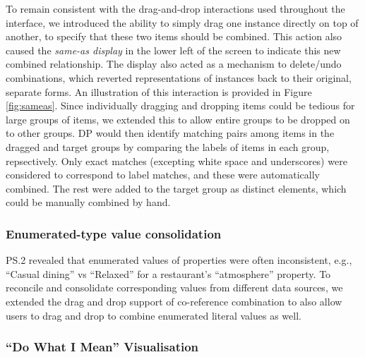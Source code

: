 \documentclass{sigchi}
\begin{document}
To remain consistent with the drag-and-drop interactions used throughout the interface, we introduced the ability to simply drag one instance directly on top of another, to specify that these two items should be combined.  This action also caused the \emph{same-as display} in the lower left of the screen to indicate this new combined relationship.  The display also acted as a mechanism to delete/undo combinations, which reverted representations of instances back to their original, separate forms. An illustration of this interaction is provided in Figure \ref{fig:sameas}.  Since individually dragging and dropping items could be tedious for large groups of items, we extended this to allow entire groups to be dropped on to other groups.  DP would then identify matching pairs among items in the dragged and target groups by comparing the labels of items in each group, repsectively.  Only exact matches (excepting white space and underscores) were considered to correspond to label matches, and these were automatically combined.  The rest were added to the target group as distinct elements, which could be manually combined by hand.


\subsubsection{Enumerated-type value consolidation}
PS.2 revealed that enumerated values of properties were often inconsistent, e.g., ``Casual dining'' vs ``Relaxed'' for a restaurant's ``atmosphere'' property. To reconcile and consolidate corresponding values from different  data sources, we extended the drag and drop support of co-reference combination to also allow users to drag and drop to combine enumerated literal values as well.  

\subsubsection{``Do What I Mean'' Visualisation}
\end{document}
